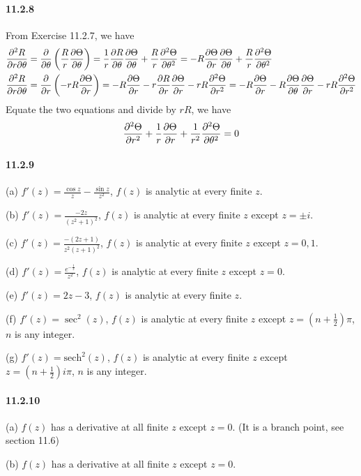 \documentclass[a4paper]{article}
\begin{document}
\paragraph{11.2.8}
From Exercise 11.2.7, we have
\begin{align*}
    & \frac{\partial^2R}{\partial r\partial\theta}=\frac{\partial}{\partial\theta}\left(\frac{R}{r}\frac{\partial\Theta}{\partial\theta}\right)=\frac{1}{r}\frac{\partial R}{\partial\theta}\frac{\partial\Theta}{\partial\theta}+\frac{R}{r}\frac{\partial^2\Theta}{\partial\theta^2}=-R\frac{\partial\Theta}{\partial r}\frac{\partial\Theta}{\partial\theta}+\frac{R}{r}\frac{\partial^2\Theta}{\partial\theta^2}\\
    & \frac{\partial^2R}{\partial r\partial\theta}=\frac{\partial}{\partial r}\left(-rR\frac{\partial\Theta}{\partial r}\right)=-R\frac{\partial\Theta}{\partial r}-r\frac{\partial R}{\partial r}\frac{\partial\Theta}{\partial r}-rR\frac{\partial^2\Theta}{\partial r^2}=-R\frac{\partial\Theta}{\partial r}-R\frac{\partial\Theta}{\partial\theta}\frac{\partial\Theta}{\partial r}-rR\frac{\partial^2\Theta}{\partial r^2}
\end{align*}
Equate the two equations and divide by $rR$, we have
\[
\frac{\partial^2\Theta}{\partial r^2}+\frac{1}{r}\frac{\partial\Theta}{\partial r}+\frac{1}{r^2}\frac{\partial^2\Theta}{\partial\theta^2}=0
\]

\paragraph{11.2.9}
(a)
$
f'(z)=\frac{\cos z}{z}-\frac{\sin z}{z^2}
$,\;
$f(z)$ is analytic at every finite $z$.
\medskip

(b)
$
f'(z)=\frac{-2z}{(z^2+1)^2}
$,\;
$f(z)$ is analytic at every finite $z$ except $z=\pm i$.
\medskip

(c)
$
f'(z)=\frac{-(2z+1)}{z^2(z+1)^2}
$,\;
$f(z)$ is analytic at every finite $z$ except $z=0,1$.
\medskip

(d)
$
f'(z)=\frac{e^{-\frac{1}{z}}}{z^2}
$,\;
$f(z)$ is analytic at every finite $z$ except $z=0$.
\medskip

(e)
$
f'(z)=2z-3
$,\;
$f(z)$ is analytic at every finite $z$.
\medskip

(f)
$
f'(z)=\sec^2(z)
$,\;
$f(z)$ is analytic at every finite $z$ except $z=(n+\frac{1}{2})\pi$, $n$ is any integer.
\medskip

(g)
$
f'(z)=\mathrm{sech}^2(z)
$,\;
$f(z)$ is analytic at every finite $z$ except $z=(n+\frac{1}{2})i\pi$, $n$ is any integer.

\paragraph{11.2.10}
(a) $f(z)$ has a derivative at all finite $z$ except $z=0$. (It is a branch point, see section 11.6)
\medskip

(b) $f(z)$ has a derivative at all finite $z$ except $z=0$.
\medskip
\end{document}
